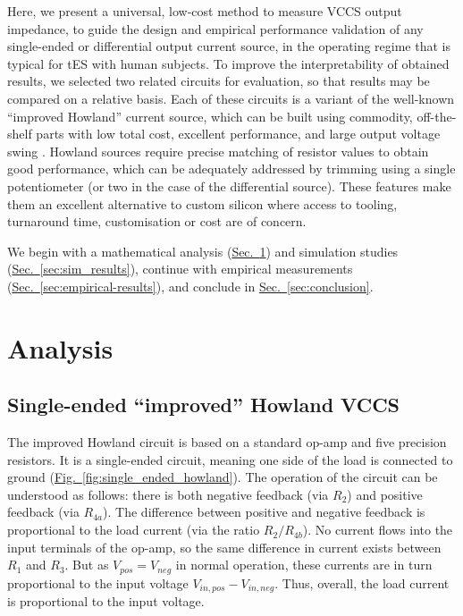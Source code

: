 \documentclass[conference]{IEEEtran}
\newcommand{\briefseclink}[1]{\hyperref[#1]{Sec.~\ref*{#1}}}
\newcommand{\brieffiglink}[1]{\hyperref[#1]{Fig.~\ref*{#1}}}
\begin{document}
Here, we present a universal, low-cost method to measure VCCS output impedance, to guide the design and empirical performance validation of any single-ended or differential output current source, in the operating regime that is typical for tES with human subjects. To improve the interpretability of obtained results, we selected two related circuits for evaluation, so that results may be compared on a relative basis. Each of these circuits is a variant of the well-known ``improved Howland'' current source, which can be built using commodity, off-the-shelf parts with low total cost, excellent performance, and large output voltage swing \cite{Franco1988}. Howland sources require precise matching of resistor values to obtain good performance, which can be adequately addressed by trimming using a single potentiometer (or two in the case of the differential source). These features make them an excellent alternative to custom silicon where access to tooling, turnaround time, customisation or cost are of concern.

We begin with a mathematical analysis (\briefseclink{sec:analysis}) and simulation studies (\briefseclink{sec:sim_results}), continue with empirical measurements (\briefseclink{sec:empirical-results}), and conclude in \briefseclink{sec:conclusion}.

\raggedbottom


\section{Analysis}
\label{sec:analysis}

\subsection{Single-ended ``improved'' Howland VCCS}
\label{sec:single_ended_howland}

The improved Howland circuit is based on a standard op-amp and five precision resistors. It is a single-ended circuit, meaning one side of the load is connected to ground (\brieffiglink{fig:single_ended_howland}). The operation of the circuit can be understood as follows: there is both negative feedback (via $R_2$) and positive feedback (via $R_{4a}$). The difference between positive and negative feedback is proportional to the load current (via the ratio $R_2/R_{4b}$). No current flows into the input terminals of the op-amp, so the same difference in current exists between $R_1$ and $R_3$. But as $V_{pos}=V_{neg}$ in normal operation, these currents are in turn proportional to the input voltage $V_{in,pos}-V_{in,neg}$. Thus, overall, the load current is proportional to the input voltage.
\end{document}
